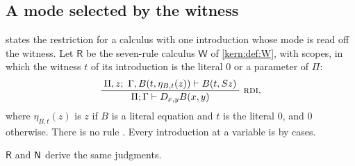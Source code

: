 \subsection{A mode selected by the witness}
\label{wit:sec:R}

 states the restriction for a calculus with one
introduction whose mode is read off the witness.  Let $\mathsf{R}$ be the
seven-rule calculus $\mathsf{W}$ of \cref{kern:def:W}, with scopes, in which
the witness $t$ of its introduction is the literal $0$ or a parameter of
$\Pi$:
\[
 \infrule{\Pi,z;\ \Gamma,B(t,\eta_{B,t}(z))\proves B(t,\Suc z)}
         {\Pi;\Gamma\proves\D{x}{y}B(x,y)}\ \rulename{RDI},
\]
where $\eta_{B,t}(z)$ is $z$ if $B$ is a literal equation and $t$ is the
literal $0$, and $0$ otherwise.  There is no rule .  Every
introduction at a variable is by cases.

\begin{theorem}
\label{wit:thm:R}
$\mathsf{R}$ and $\mathsf{N}$ derive the same judgments.
\end{theorem}

